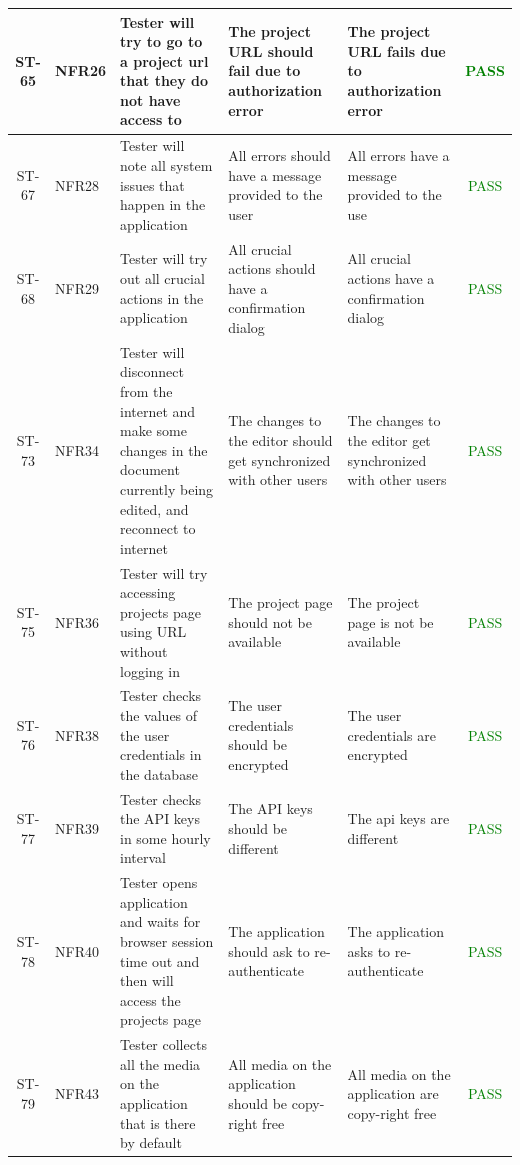 \documentclass[12pt, titlepage]{article}
\begin{document}
\begin{center}
\begin{longtable}{|c|p{1.2cm}|p{2.7cm}|p{3cm}|p{3cm}|c|}
			\hline
			ST-65 & NFR26 & Tester will try to go to a project url that they do not have access to & The project URL should fail due to authorization error & The project URL fails due to authorization error &  \textcolor{green}{PASS} \\
			\hline
			ST-67 & NFR28 & Tester will note all system issues that happen in the application & All errors should have a message provided to the user & All errors have a message provided to the use &  \textcolor{green}{PASS} \\
			\hline
			ST-68 & NFR29 & Tester will try out all crucial actions in the application & All crucial actions should have a confirmation dialog & All crucial actions have a confirmation dialog &  \textcolor{green}{PASS} \\
			\hline
			ST-73 & NFR34 & Tester will disconnect from the internet and make some changes in the document currently being edited, and reconnect to internet & The changes to the editor should  get synchronized with other users & The changes to the editor get synchronized with other users &  \textcolor{green}{PASS} \\
			\hline
			ST-75 & NFR36 & Tester will try accessing projects page using URL without logging in & The project page should not be available & The project page is not be available &  \textcolor{green}{PASS} \\
			\hline
			ST-76 & NFR38 & Tester checks the values of the user credentials in the database & The user credentials should be encrypted & The user credentials are encrypted &  \textcolor{green}{PASS} \\
			\hline
			ST-77 & NFR39 & Tester checks the API keys in some hourly interval & The API keys should be different & The api keys are different &  \textcolor{green}{PASS} \\
			\hline
			ST-78 & NFR40 & Tester opens application and waits for browser session time out and then will access the projects page & The application should ask to re-authenticate & The application asks to re-authenticate &  \textcolor{green}{PASS} \\
			\hline
			ST-79 & NFR43 & Tester collects all the media on the application that is there by default  & All media on the application should be copy-right free & All media on the application are copy-right free &  \textcolor{green}{PASS} \\
			\hline
		\end{longtable}
	\end{center}
	
\end{document}
